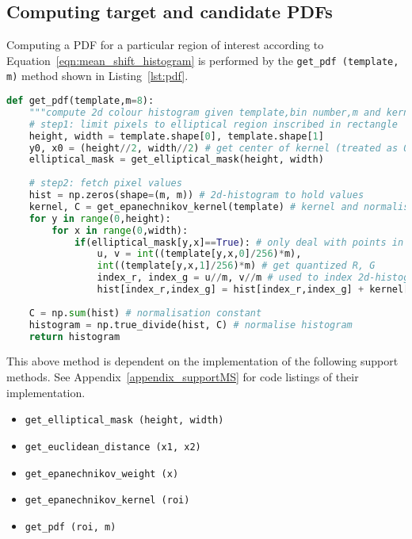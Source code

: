 \subsection{Computing target and candidate PDFs}
Computing a PDF for a particular region of interest according to 
Equation~\ref{eqn:mean_shift_histogram} is performed by the \lstinline{get_pdf (template, m)} 
method shown in Listing~\ref{lst:pdf}.

\begin{lstlisting}[language=Python, caption={Function computing the PDF}, captionpos=b, label={lst:pdf}]
def get_pdf(template,m=8):
    """compute 2d colour histogram given template,bin number,m and kernel function"""
    # step1: limit pixels to elliptical region inscribed in rectangle
    height, width = template.shape[0], template.shape[1]
    y0, x0 = (height//2, width//2) # get center of kernel (treated as 0,0) == hy and hx 
    elliptical_mask = get_elliptical_mask(height, width)
       
    # step2: fetch pixel values
    hist = np.zeros(shape=(m, m)) # 2d-histogram to hold values 
    kernel, C = get_epanechnikov_kernel(template) # kernel and normalisation constant, C
    for y in range(0,height):
        for x in range(0,width): 
            if(elliptical_mask[y,x]==True): # only deal with points in the mask
                u, v = int((template[y,x,0]/256)*m),
                int((template[y,x,1]/256)*m) # get quantized R, G
                index_r, index_g = u//m, v//m # used to index 2d-histogram
                hist[index_r,index_g] = hist[index_r,index_g] + kernel[y,x] # add weighted point
    
    C = np.sum(hist) # normalisation constant
    histogram = np.true_divide(hist, C) # normalise histogram
    return histogram 
\end{lstlisting}

This above method is dependent on the implementation of the following support
methods. See Appendix~\ref{appendix_supportMS} for code listings of their implementation.
\begin{itemize}
    \item \lstinline{get_elliptical_mask (height, width)}
    \item \lstinline{get_euclidean_distance (x1, x2)}
    \item \lstinline{get_epanechnikov_weight (x)}
    \item \lstinline{get_epanechnikov_kernel (roi)}
    \item \lstinline{get_pdf (roi, m)}
\end{itemize}

